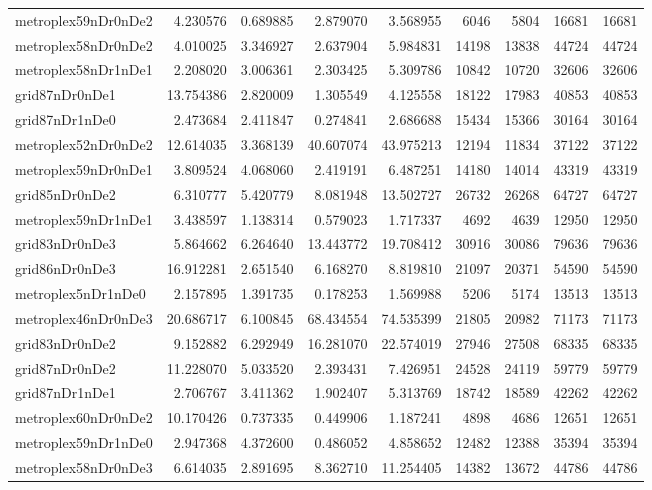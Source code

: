 \begin{longtable}{|l|r|r|r|r|r|r|r|r|}
metroplex59nDr0nDe2 & 4.230576 & 0.689885 & 2.879070 & 3.568955 & 6046 & 5804 & 16681 & 16681 \\
metroplex58nDr0nDe2 & 4.010025 & 3.346927 & 2.637904 & 5.984831 & 14198 & 13838 & 44724 & 44724 \\
metroplex58nDr1nDe1 & 2.208020 & 3.006361 & 2.303425 & 5.309786 & 10842 & 10720 & 32606 & 32606 \\
grid87nDr0nDe1 & 13.754386 & 2.820009 & 1.305549 & 4.125558 & 18122 & 17983 & 40853 & 40853 \\
grid87nDr1nDe0 & 2.473684 & 2.411847 & 0.274841 & 2.686688 & 15434 & 15366 & 30164 & 30164 \\
metroplex52nDr0nDe2 & 12.614035 & 3.368139 & 40.607074 & 43.975213 & 12194 & 11834 & 37122 & 37122 \\
metroplex59nDr0nDe1 & 3.809524 & 4.068060 & 2.419191 & 6.487251 & 14180 & 14014 & 43319 & 43319 \\
grid85nDr0nDe2 & 6.310777 & 5.420779 & 8.081948 & 13.502727 & 26732 & 26268 & 64727 & 64727 \\
metroplex59nDr1nDe1 & 3.438597 & 1.138314 & 0.579023 & 1.717337 & 4692 & 4639 & 12950 & 12950 \\
grid83nDr0nDe3 & 5.864662 & 6.264640 & 13.443772 & 19.708412 & 30916 & 30086 & 79636 & 79636 \\
grid86nDr0nDe3 & 16.912281 & 2.651540 & 6.168270 & 8.819810 & 21097 & 20371 & 54590 & 54590 \\
metroplex5nDr1nDe0 & 2.157895 & 1.391735 & 0.178253 & 1.569988 & 5206 & 5174 & 13513 & 13513 \\
metroplex46nDr0nDe3 & 20.686717 & 6.100845 & 68.434554 & 74.535399 & 21805 & 20982 & 71173 & 71173 \\
grid83nDr0nDe2 & 9.152882 & 6.292949 & 16.281070 & 22.574019 & 27946 & 27508 & 68335 & 68335 \\
grid87nDr0nDe2 & 11.228070 & 5.033520 & 2.393431 & 7.426951 & 24528 & 24119 & 59779 & 59779 \\
grid87nDr1nDe1 & 2.706767 & 3.411362 & 1.902407 & 5.313769 & 18742 & 18589 & 42262 & 42262 \\
metroplex60nDr0nDe2 & 10.170426 & 0.737335 & 0.449906 & 1.187241 & 4898 & 4686 & 12651 & 12651 \\
metroplex59nDr1nDe0 & 2.947368 & 4.372600 & 0.486052 & 4.858652 & 12482 & 12388 & 35394 & 35394 \\
metroplex58nDr0nDe3 & 6.614035 & 2.891695 & 8.362710 & 11.254405 & 14382 & 13672 & 44786 & 44786 \\

\end{longtable}
